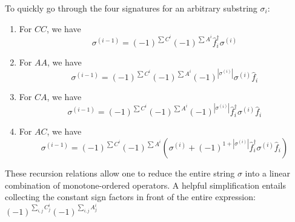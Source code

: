 \documentclass[12pt]{article}
\newcommand{\hc}{^\dagger}
\begin{document}
	To quickly go through the four signatures for an arbitrary substring $\sigma_i$:
	\begin{enumerate}
	\item For $CC$, we have
	\begin{equation}
	\sigma^{(i - 1)} = (-1)^{\sum C^i} (-1)^{\sum A^i} \hat{f}_i\hc \sigma^{(i)}
	\end{equation}
	\item For $AA$, we have
	\begin{equation}
	\sigma^{(i - 1)} = (-1)^{\sum C^i} (-1)^{\sum A^i} (-1)^{|\sigma^{(i)}|} \sigma^{(i)} \hat{f}_i
	\end{equation}
	\item For $CA$, we have
	\begin{equation}
	\sigma^{(i - 1)} = (-1)^{\sum C^i} (-1)^{\sum A^i} (-1)^{|\sigma^{(i)}|} \hat{f}_i\hc \sigma^{(i)} \hat{f}_i
	\end{equation}
	\item For $AC$, we have
	\begin{equation}
	\sigma^{(i - 1)} = (-1)^{\sum C^i} (-1)^{\sum A^i} \left( \sigma^{(i)} + (-1)^{1+|\sigma^{(i)}|} \hat{f}_i\hc \sigma^{(i)} \hat{f}_i \right)
	\end{equation}
	\end{enumerate}
	
	These recursion relations allow one to reduce the entire string $\sigma$ into a linear combination of monotone-ordered operators. A helpful simplification entails collecting the constant sign factors in front of the entire expression:
	$(-1)^{\sum_{i,j} C^i_j} (-1)^{\sum_{i,j} A^i_j}$
	
	
\end{document}
